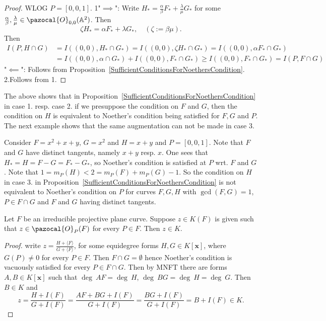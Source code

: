     \begin{proof}
         WLOG $P=[0,0,1]$.
        1"$\implies$": Write $H_\ast = \frac{\alpha}{\beta}F_\ast+\frac{\lambda}{\mu}G_\ast$  for some $\frac{\alpha}{\beta},\frac{\lambda}{\mu}\in\pazocal{O}_{0,0}(\A^2)$. Then 
        $$\zeta H_\ast = \alpha F_\ast + \lambda G_\ast, \quad (\zeta := \beta\mu).$$
            Then 
        \begin{align*}
            I(P,H\cap G)&= I((0,0), H_\ast \cap G_\ast) = I((0,0), \zeta H_\ast\cap G_\ast) = I((0,0), \alpha F_\ast\cap G_\ast)\\
            &= I((0,0), \alpha \cap G_\ast) + I((0,0), F_\ast \cap G_\ast) \geq I((0,0), F_\ast\cap G_\ast) = I(P,F\cap G)
        \end{align*}
        "$\impliedby$": Follows from Proposition~\ref{SufficientConditionsForNoethersCondition}.\\
        2.Follows from 1. 
    \end{proof}
    \begin{remark}
        The above shows that in Proposition~\ref{SufficientConditionsForNoethersCondition} in case 1. resp. case 2. if we presuppose the condition on $F$ and $G$, then the condition on $H$ is equivalent to Noether's condition being satisfied for $F,G$ and $P$. The next example shows that the same augmentation can not be made in case 3.
    \end{remark}
    \begin{example}
        Consider $F=x^2+x+y$, $G=x^2$ and $H=x+y$ and $P=[0,0,1]$. Note that $F$ and $G$ have distinct tangents, namely $x+y$ resp. $x$. One sees that $H_\ast = H=F-G=F_\ast-G_\ast$, so Noether's condition is satisfied at $P$ wrt. $F$ and $G$. Note that $1=m_P(H)<2=m_P(F)+m_P(G)-1$. So the condition on $H$ in case 3. in Proposition~\ref{SufficientConditionsForNoethersCondition} is not equivalent to Noether's condition on $P$ for curves $F,G, H$ with $\gcd(F,G)=1$, $P\in F\cap G$ and $F$ and $G$ having distinct tangents.
    \end{example}
    \begin{proposition}
        Let $F$ be an irreducible projective plane curve. Suppose $z\in K(F)$ is given such that $z\in \pazocal{O}_P(F)$ for every $P\in F$. Then $z\in K$.
    \end{proposition}
    \begin{proof}
        write $z=\frac{H+\langle F\rangle}{G+\langle F\rangle} $, for some equidegree forms $H,G\in K[\mathbf{x}]$, where $G(P)\neq 0$ for every $P\in F$. Then $F\cap G=\emptyset$ hence Noether's condition is vacuously satisfied for every $P\in F\cap G$. Then by MNFT there are forms $A,B\in K[\mathbf{x}]$ such that $\deg \ AF = \deg \ H$, $\deg \ BG= \deg \ H = \deg \ G $. Then $B\in K$ and 
        $$z = \frac{H+I(F)}{G+ I(F)} = \frac{AF+BG+I(F)}{G+I(F)}= \frac{BG+ I(F)}{G+ I(F)}=B+I(F)\in K.$$
    \end{proof}
